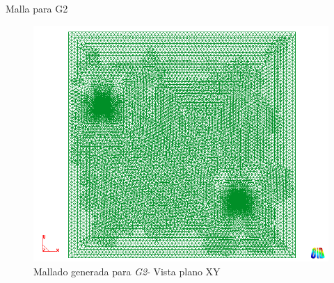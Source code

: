 \documentclass[spanish]{beamer}
\begin{document}
%
\begin{frame}{Malla para G2}\begin{center}
\begin{figure}[tbhp]
\centerline{\includegraphics[scale=0.25]{../img/200m/200_xy_contorno_malla}}
\caption{Mallado generada para \emph{G2}- Vista plano XY}
\label{200_xy_contorno_malla}
\end{figure}
\end{center}\end{frame}
\end{document}
